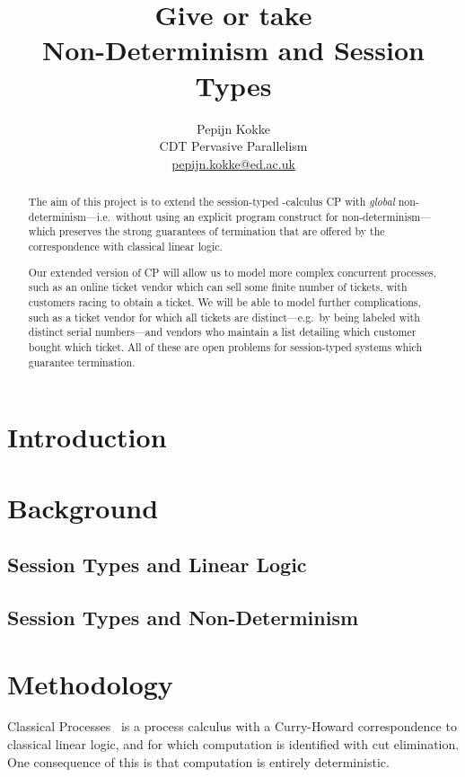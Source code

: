 \documentclass[twocolumn]{article}
\title{Give or take \\
  {\large Non-Determinism and Session Types}}
\author{Pepijn Kokke \\
  CDT Pervasive Parallelism \\
  \url{pepijn.kokke@ed.ac.uk}}
\begin{document}
\maketitle

\begin{abstract}
  The aim of this project is to extend the session-typed \textpi-calculus CP
  \citep{wadler2012} with \emph{global} non-determinism---i.e.\ without using an
  explicit program construct for non-determinism---which preserves the strong
  guarantees of termination that are offered by the correspondence with
  classical linear logic. 
   
  Our extended version of CP will allow us to model more complex concurrent
  processes, such as an online ticket vendor which can sell some finite number
  of tickets, with customers racing to obtain a ticket.
  We will be able to model further complications, such as a ticket vendor for
  which all tickets are distinct---e.g.\ by being labeled with distinct serial
  numbers---and vendors who maintain a list detailing which customer bought
  which ticket.
  All of these are open problems for session-typed systems which guarantee
  termination.
\end{abstract}

\section{Introduction}

\section{Background}

\subsection{Session Types and Linear Logic}
\citet{caires2010}
\citet{wadler2012}

\subsection{Session Types and Non-Determinism}
\citet{caires2014,atkey2016,caires2017}

\section{Methodology}
Classical Processes~\citep[CP;][]{wadler2012} is a process calculus with a
Curry-Howard correspondence to classical linear logic, and for which computation
is identified with cut elimination. One consequence of this is that computation
is entirely deterministic.
\end{document}

